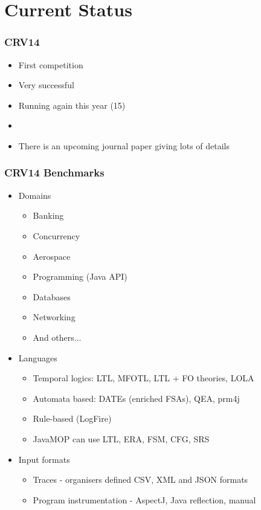 \documentclass{beamer}
\begin{document}
\section{Current Status}

\begin{frame}
\frametitle{CRV14}
\begin{itemize}
	\item First competition
	\item Very successful
	\item Running again this year (15)
	\item[]
	\item There is an upcoming journal paper giving lots of details
\end{itemize}
\end{frame}

\begin{frame}
\frametitle{CRV14 Benchmarks}
\begin{itemize}
	\item Domains \begin{multicols}{2}
	\begin{itemize}
		\item Banking
		\item Concurrency
		\item Aerospace
		\item Programming (Java API)
		\item Databases
		\item Networking
		\item And others...
	\end{itemize}
	\end{multicols}
	\item Languages
	\begin{itemize}
		\item Temporal logics: LTL, MFOTL, LTL + FO theories, LOLA
		\item Automata based: DATEs (enriched FSAs), QEA, prm4j
		\item Rule-based (LogFire)
		\item JavaMOP can use LTL, ERA, FSM, CFG, SRS 
	\end{itemize}	
	\item Input formats
	\begin{itemize}
		\item Traces - organisers defined CSV, XML and JSON formats
		\item Program instrumentation - AspectJ, Java reflection, manual
	\end{itemize}	

\end{itemize}
\end{frame}
\end{document}
